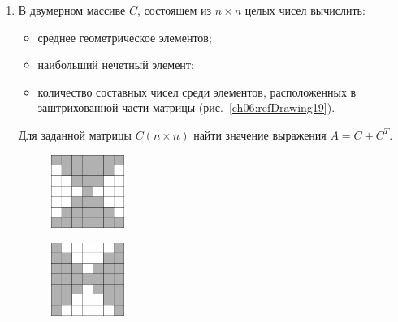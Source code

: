 \begin{enumerate}


\item В двумерном массиве $C$, состоящем из $n\times n$ целых чисел вычислить:

\begin{itemize}
\item среднее геометрическое элементов;
\item наибольший нечетный элемент;
\item количество составных чисел среди элементов, расположенных в заштрихованной 
части матрицы (рис.~\ref{ch06:refDrawing19}).
\end{itemize}
Для заданной матрицы $C(n\times n)$ найти значение выражения  $A=C+C^T$.

\begin{figure}%
\begin{floatrow}[4]
\ffigbox[\FBwidth]
{%
\captionsetup{labelfont=footnotesize}\caption{}%
\label{ch06:refDrawing19}}
{\includegraphics[width=0.225\textwidth,keepaspectratio]{img/ris_6_20}}%

\ffigbox[\FBwidth]
{\caption{}%
\label{ch06:refDrawing20}}
{\includegraphics[width=0.225\textwidth,keepaspectratio]{img/ris_6_21}}%


\end{floatrow}
\end{figure}
\end{enumerate}
